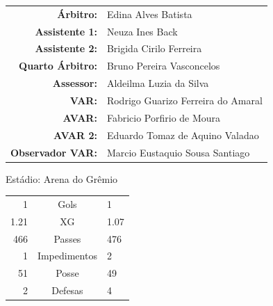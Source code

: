 \documentclass[11pt]{article}
\begin{document}
\vspace{0.5cm}
\begin{minipage}{0.65\textwidth}
\begin{center}
\begin{tabular}{rl}
\textbf{Árbitro:} & Edina Alves Batista \\
\textbf{Assistente 1:} & Neuza Ines Back \\
\textbf{Assistente 2:} & Brigida Cirilo Ferreira \\
\textbf{Quarto Árbitro:} & Bruno Pereira Vasconcelos \\
\textbf{Assessor:} & Aldeilma Luzia da Silva \\
\textbf{VAR:} & Rodrigo Guarizo Ferreira do Amaral \\
\textbf{AVAR:} & Fabricio Porfirio de Moura \\
\textbf{AVAR 2:} & Eduardo Tomaz de Aquino Valadao \\
\textbf{Observador VAR:} & Marcio Eustaquio Sousa Santiago \\
\end{tabular}
\end{center}
\end{minipage}
\begin{minipage}{0.3\textwidth}
Estádio: Arena do Grêmio\\
\begin{tabular}{rcl}
1 & Gols & 1 \\
1.21 & XG & 1.07 \\
466 & Passes & 476 \\
1 & Impedimentos & 2 \\
51 & Posse & 49 \\
2 & Defesas & 4 \\
\end{tabular}
\end{minipage}
\newpage
\end{document}
